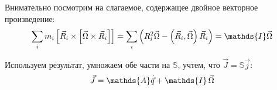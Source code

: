 \documentclass[12pt]{article}
\newcommand{\bbA}{\mathds{A}}
\newcommand{\bbI}{\mathds{I}}
\newcommand{\bbS}{\mathds{S}}
\newcommand{\lb}{\left(}
\newcommand{\rb}{\right)}
\begin{document}
Внимательно посмотрим на слагаемое, содержащее двойное векторное произведение:
\begin{gather}
\sum_i m_i \left[ \vec{R}_i \times \left[ \vec{\Omega} \times \vec{R}_i \right] \right] = \sum_i \lb R_i^2 \vec{\Omega} - \lb \vec{R}_i , \vec{\Omega} \rb \vec{R}_i \rb = \bbI \vec{\Omega} \notag
\end{gather}

Используем результат, умножаем обе части на $\bbS$, учтем, что $\vec{J} = \bbS \vec{j}$: 
\begin{gather}
\vec{J} = \bbA \dot{\vec{q}} + \bbI \, \vec{\Omega} \notag 
\end{gather}
\end{document}
